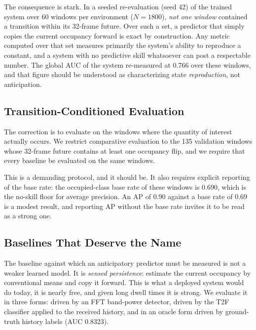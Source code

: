 \documentclass[lettersize,journal]{IEEEtran}
\begin{document}
The consequence is stark. In a seeded re-evaluation (seed 42) of the
trained system over 60 windows per environment ($N = 1800$), \emph{not
one window} contained a transition within its 32-frame future. Over such
a set, a predictor that simply copies the current occupancy forward is
exact by construction. Any metric computed over that set measures
primarily the system's ability to reproduce a constant, and a system
with no predictive skill whatsoever can post a respectable number. The
global AUC of the system re-measured at 0.766 over these windows, and
that figure should be understood as characterizing state
\emph{reproduction}, not anticipation.

\subsection{\textbf{Transition-Conditioned Evaluation}}
The correction is to evaluate on the windows where the quantity of
interest actually occurs. We restrict comparative evaluation to the 135
validation windows whose 32-frame future contains at least one occupancy
flip, and we require that every baseline be evaluated on the same
windows.

This is a demanding protocol, and it should be. It also requires
explicit reporting of the base rate: the occupied-class base rate of
these windows is 0.690, which is the no-skill floor for average
precision. An AP of 0.90 against a base rate of 0.69 is a modest result,
and reporting AP without the base rate invites it to be read as a strong
one.

\subsection{\textbf{Baselines That Deserve the Name}}
The baseline against which an anticipatory predictor must be measured is
not a weaker learned model. It is \emph{sensed persistence}: estimate the
current occupancy by conventional means and copy it forward. This is what
a deployed system would do today, it is nearly free, and given long dwell
times it is strong. We evaluate it in three forms: driven by an FFT
band-power detector, driven by the T2F classifier applied to the received
history, and in an oracle form driven by ground-truth history labels
(AUC 0.8323).
\end{document}
